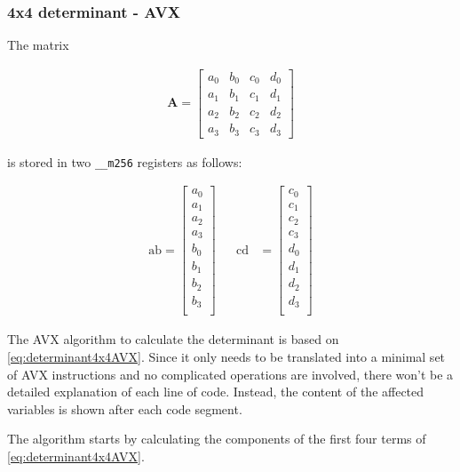 \subsubsection{4x4 determinant - AVX}
\label{sec:determinant4x4AVX}

The matrix 

\begin{align*}
\mathbf{A}
=
\begin{bmatrix}
a_0&b_0&c_0&d_0\\
a_1&b_1&c_1&d_1\\
a_2&b_2&c_2&d_2\\
a_3&b_3&c_3&d_3
\end{bmatrix}
\end{align*}

is stored in two \texttt{__m256} registers as follows:

\begin{align*}
\mathrm{ab} 
=
\begin{bmatrix}
a_0\\
a_1\\
a_2\\
a_3\\
b_0\\
b_1\\
b_2\\
b_3\\
\end{bmatrix}
&&
\mathrm{cd} 
&=
\begin{bmatrix}
c_0\\
c_1\\
c_2\\
c_3\\
d_0\\
d_1\\
d_2\\
d_3\\
\end{bmatrix}
\end{align*}

The AVX algorithm to calculate the determinant is based on \cref{eq:determinant4x4AVX}.
Since it only needs to be translated into a minimal set of AVX instructions and no complicated operations are involved, there won't be a detailed explanation of each line of code.
Instead, the content of the affected variables is shown after each code segment.

The algorithm starts by calculating the components of the first four terms of \cref{eq:determinant4x4AVX}.


